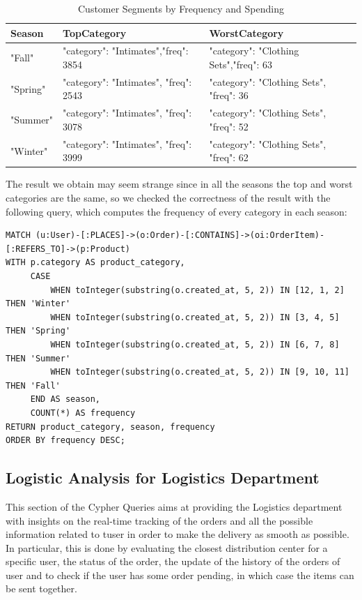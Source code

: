 \documentclass[a4paper,12pt]{article}
\begin{document}
\begin{table}[h!]
  \centering
  \caption{Customer Segments by Frequency and Spending}
  \label{tab:customer_segments}
  \begin{tabular}{l l l}
      \toprule
      \textbf{Season} & \textbf{TopCategory} & \textbf{WorstCategory}\\
      \midrule
      "Fall" & {"category": "Intimates","freq": 3854} & {"category": "Clothing Sets","freq": 63} \\
      "Spring" & {"category": "Intimates", "freq": 2543} & {"category": "Clothing Sets", "freq": 36} \\
      "Summer" & {"category": "Intimates", "freq": 3078} & {"category": "Clothing Sets", "freq": 52} \\
      "Winter" & {"category": "Intimates", "freq": 3999} & {"category": "Clothing Sets", "freq": 62} \\
      \bottomrule
  \end{tabular}
\end{table}
The result we obtain may seem strange since in all the seasons the top and worst categories are the same, so we checked the correctness of the result with the following query, which computes the frequency of every category in each season:
\begin{verbatim}
MATCH (u:User)-[:PLACES]->(o:Order)-[:CONTAINS]->(oi:OrderItem)-[:REFERS_TO]->(p:Product)
WITH p.category AS product_category, 
     CASE 
         WHEN toInteger(substring(o.created_at, 5, 2)) IN [12, 1, 2] THEN 'Winter'
         WHEN toInteger(substring(o.created_at, 5, 2)) IN [3, 4, 5] THEN 'Spring'
         WHEN toInteger(substring(o.created_at, 5, 2)) IN [6, 7, 8] THEN 'Summer'
         WHEN toInteger(substring(o.created_at, 5, 2)) IN [9, 10, 11] THEN 'Fall'
     END AS season, 
     COUNT(*) AS frequency
RETURN product_category, season, frequency
ORDER BY frequency DESC;
\end{verbatim}


\subsection{Logistic Analysis for Logistics Department}
This section of the Cypher Queries aims at providing the Logistics department with insights on the real-time tracking of the orders and all the possible information related to tuser in order to make the delivery as smooth as possible.
In particular, this is done by evaluating the closest distribution center for a specific user, the status of the order, the update of the history of the orders of user and to check if the user has some order pending, in which case the items can be sent together. 
\end{document}
